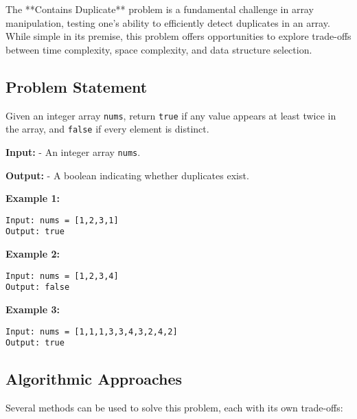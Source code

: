 \label{problem:Contains_Duplicate}

The **Contains Duplicate** problem is a fundamental challenge in array manipulation, testing one’s ability to efficiently detect duplicates in an array. While simple in its premise, this problem offers opportunities to explore trade-offs between time complexity, space complexity, and data structure selection.

\subsection*{Problem Statement}
Given an integer array \texttt{nums}, return \texttt{true} if any value appears at least twice in the array, and \texttt{false} if every element is distinct.

\textbf{Input:}
- An integer array \texttt{nums}.

\textbf{Output:}
- A boolean indicating whether duplicates exist.

\textbf{Example 1:}
\begin{verbatim}
Input: nums = [1,2,3,1]
Output: true
\end{verbatim}

\textbf{Example 2:}
\begin{verbatim}
Input: nums = [1,2,3,4]
Output: false
\end{verbatim}

\textbf{Example 3:}
\begin{verbatim}
Input: nums = [1,1,1,3,3,4,3,2,4,2]
Output: true
\end{verbatim}

\subsection*{Algorithmic Approaches}
Several methods can be used to solve this problem, each with its own trade-offs:


